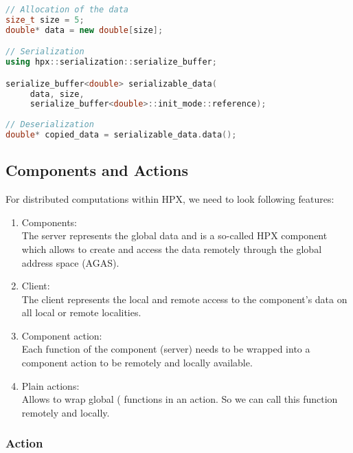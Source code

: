 \begin{lstlisting}[language=c++,caption={Serialization in HPX.\label{code:hpx:serialization}},float,floatplacement=tb]
// Allocation of the data
size_t size = 5;
double* data = new double[size];

// Serialization
using hpx::serialization::serialize_buffer;

serialize_buffer<double> serializable_data(
     data, size,
     serialize_buffer<double>::init_mode::reference);
     
// Deserialization
double* copied_data = serializable_data.data();
\end{lstlisting}


\subsection{Components and Actions}
\label{sec:hpx:components:actions}
For distributed computations within HPX, we need to look following features:
\begin{enumerate}
\item Components: \\
The server represents the global data and is a so-called HPX component which allows to create and access the data remotely through the global address space (AGAS)\cite{kaiser2014hpx}. 
\item Client: \\
The client represents the local and remote access to the component's data on all local or remote localities. 
\item Component action:\\
Each function of the component (server) needs to be wrapped into a component action to be remotely and locally available.
\item Plain actions: \\
Allows to wrap global ( functions in an action. So we can call this function remotely and locally.
\end{enumerate}



\subsubsection{Action}


